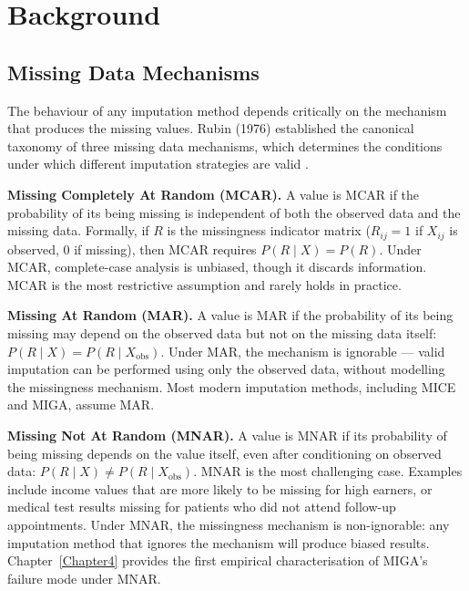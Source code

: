 
\chapter{Background}
\label{Chapter2}


\section{Missing Data Mechanisms}

The behaviour of any imputation method depends critically on the mechanism that produces the missing values. Rubin (1976) established the canonical taxonomy of three missing data mechanisms, which determines the conditions under which different imputation strategies are valid \cite{Rubin1976}.

\textbf{Missing Completely At Random (MCAR).} A value is MCAR if the probability of its being missing is independent of both the observed data and the missing data. Formally, if $R$ is the missingness indicator matrix ($R_{ij} = 1$ if $X_{ij}$ is observed, 0 if missing), then MCAR requires $P(R \mid X) = P(R)$. Under MCAR, complete-case analysis is unbiased, though it discards information. MCAR is the most restrictive assumption and rarely holds in practice.

\textbf{Missing At Random (MAR).} A value is MAR if the probability of its being missing may depend on the observed data but not on the missing data itself: $P(R \mid X) = P(R \mid X_{\text{obs}})$. Under MAR, the mechanism is ignorable \cite{Rubin1976} --- valid imputation can be performed using only the observed data, without modelling the missingness mechanism. Most modern imputation methods, including MICE and MIGA, assume MAR.

\textbf{Missing Not At Random (MNAR).} A value is MNAR if its probability of being missing depends on the value itself, even after conditioning on observed data: $P(R \mid X) \neq P(R \mid X_{\text{obs}})$. MNAR is the most challenging case. Examples include income values that are more likely to be missing for high earners, or medical test results missing for patients who did not attend follow-up appointments. Under MNAR, the missingness mechanism is non-ignorable: any imputation method that ignores the mechanism will produce biased results. Chapter~\ref{Chapter4} provides the first empirical characterisation of MIGA's failure mode under MNAR.

